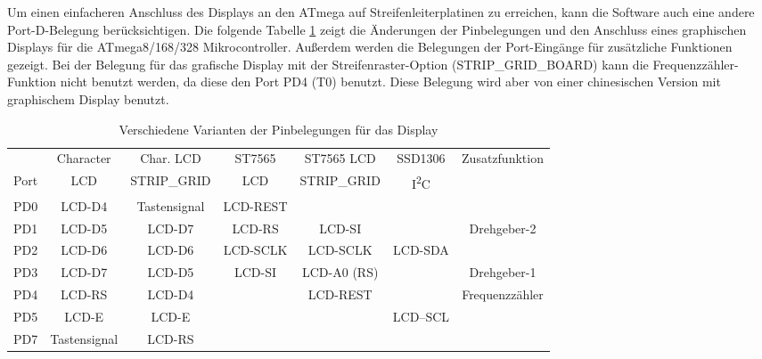 Um einen einfacheren Anschluss des Displays an den ATmega auf Streifenleiterplatinen zu erreichen,
kann die Software auch eine andere Port-D-Belegung berücksichtigen.
Die folgende Tabelle \ref{tab:grid-change} zeigt die Änderungen der Pinbelegungen und den
Anschluss eines graphischen Displays für die ATmega8/168/328 Mikrocontroller.
Außerdem werden die Belegungen der Port-Eingänge für zusätzliche Funktionen gezeigt. 
Bei der Belegung für das grafische Display mit der Streifenraster-Option (STRIP\_GRID\_BOARD)
kann die Frequenzzähler-Funktion nicht benutzt werden, da diese den Port PD4 (T0) benutzt.
Diese Belegung wird aber von einer chinesischen Version mit graphischem Display benutzt.


\begin{table}[H]
  \begin{center}
    \begin{tabular}{| c || c | c | c | c | c | c |}
    \hline
           & Character     & Char. LCD      & ST7565     & ST7565 LCD     & SSD1306     & Zusatzfunktion \\
      Port & LCD           & STRIP\_GRID    &   LCD      & STRIP\_GRID    &    I\textsuperscript{2}C      & \\
    \hline
    \hline
    PD0    &  LCD-D4       &  Tastensignal  &  LCD-REST  &                &             & \\
    \hline
    PD1    &  LCD-D5       &  LCD-D7        &  LCD-RS    & LCD-SI         &             & Drehgeber-2 \\
    \hline
    PD2    &  LCD-D6       &  LCD-D6        &  LCD-SCLK  & LCD-SCLK       &   LCD-SDA   & \\
    \hline
    PD3    &  LCD-D7       &  LCD-D5        &  LCD-SI    & LCD-A0 (RS)    &             & Drehgeber-1 \\
    \hline
    PD4    &  LCD-RS       &  LCD-D4        &            & LCD-REST       &             & Frequenzzähler \\
    \hline
    PD5    &  LCD-E        &  LCD-E         &            &                &   LCD--SCL  & \\
    \hline
    PD7    &  Tastensignal & LCD-RS         &            &                &             & \\
    \hline
    \end{tabular}
  \end{center}
  \caption{Verschiedene Varianten der Pinbelegungen für das Display}
  \label{tab:grid-change}
\end{table}

